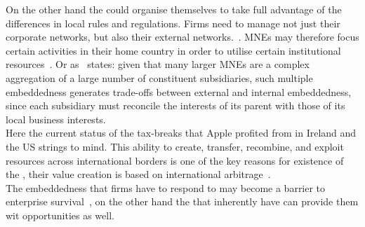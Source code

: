 On the other hand the \mne could organise themselves to take full advantage of the differences in local rules and regulations.
Firms need to manage not just their corporate networks, but also their external networks.~\cite{Meyer:2011vt}. 
MNEs may therefore focus certain activities in their home country in order to utilise certain institutional resources~\cite{Jackson:2008cz}.
Or as~\cite{Meyer:2011vt} states: given that many larger MNEs are a complex aggregation of a large number of constituent subsidiaries, such multiple embeddedness generates trade-offs between external and internal embeddedness, since each subsidiary must reconcile the interests of its parent with those of its local business interests.\\ 
Here the current status of the tax-breaks that Apple profited from in Ireland and the US strings to mind.
This ability to create, transfer, recombine, and exploit resources across international borders is one of the key reasons for existence of the  \mne, their value creation is based on international arbitrage~\cite{Meyer:2011vt}.\\

The embeddedness that firms have to respond to may become a barrier to enterprise survival~\cite{Newman:2000fc}, on the other hand the \me that \mne inherently have can provide them wit opportunities as well.
